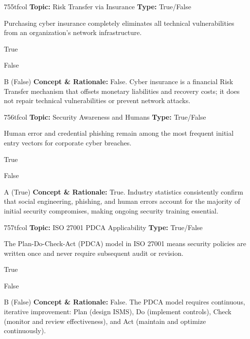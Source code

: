 \begin{qcard}{755}{tfcol}
\textcolor{darkslate!75}{\small\textbf{Topic:} Risk Transfer via Insurance \hfill \textbf{Type:} True/False}\vspace{0.4em}\par
Purchasing cyber insurance completely eliminates all technical vulnerabilities from an organization's network infrastructure.
\begin{qoptions}
\item True
\item False
\end{qoptions}
\end{qcard}
\nopagebreak
\begin{explainbox}{B (False)}
\textbf{Concept \& Rationale:} False. Cyber insurance is a financial Risk Transfer mechanism that offsets monetary liabilities and recovery costs; it does not repair technical vulnerabilities or prevent network attacks.
\end{explainbox}

\begin{qcard}{756}{tfcol}
\textcolor{darkslate!75}{\small\textbf{Topic:} Security Awareness and Humans \hfill \textbf{Type:} True/False}\vspace{0.4em}\par
Human error and credential phishing remain among the most frequent initial entry vectors for corporate cyber breaches.
\begin{qoptions}
\item True
\item False
\end{qoptions}
\end{qcard}
\nopagebreak
\begin{explainbox}{A (True)}
\textbf{Concept \& Rationale:} True. Industry statistics consistently confirm that social engineering, phishing, and human errors account for the majority of initial security compromises, making ongoing security training essential.
\end{explainbox}

\begin{qcard}{757}{tfcol}
\textcolor{darkslate!75}{\small\textbf{Topic:} ISO 27001 PDCA Applicability \hfill \textbf{Type:} True/False}\vspace{0.4em}\par
The Plan-Do-Check-Act (PDCA) model in ISO 27001 means security policies are written once and never require subsequent audit or revision.
\begin{qoptions}
\item True
\item False
\end{qoptions}
\end{qcard}
\nopagebreak
\begin{explainbox}{B (False)}
\textbf{Concept \& Rationale:} False. The PDCA model requires continuous, iterative improvement: Plan (design ISMS), Do (implement controls), Check (monitor and review effectiveness), and Act (maintain and optimize continuously).
\end{explainbox}

